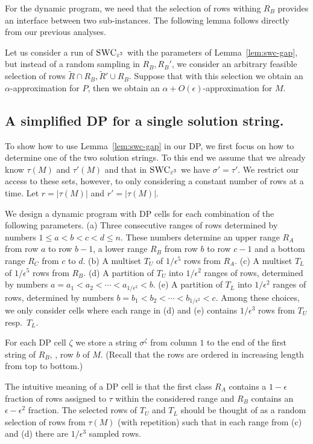     For the dynamic program, we need that the selection of rows withing $R_B$ provides an interface between two sub-instances.
    The following lemma follows directly from our previous analyses.
    \begin{lemma}\label{lem:forgetA}
        Let us consider a run of $\textsc{SWC}_{\varepsilon^3}$ with the parameters of Lemma~\ref{lem:swc-gap}, but instead of a random sampling in $R_B,R_B'$,
        we consider an arbitrary feasible selection of rows $\tilde{R} \cap R_B,\tilde{R}' \cup R_B$.
        Suppose that with this selection we obtain an $\alpha$-approximation for $P$, then we obtain an $\alpha + O(\epsilon)$-approximation for $M$.
    \end{lemma}

\subsection{A simplified DP for a single solution string.}\label{sec:single}
To show how to use Lemma~\ref{lem:swc-gap} in our DP, we first focus on how to determine one of the two solution strings.
To this end we assume that we already know $\tau(M)$ and $\tau'(M)$ and that in $\textsc{SWC}_{\varepsilon^3}$ we have $\sigma' = \tau'$.
We restrict our access to these sets, however, to only considering a constant number of rows at a time.
Let $r = |\tau(M)|$ and $r' = |\tau(M)|$.

We design a dynamic program with DP cells for each combination of the following parameters. 
(a) Three consecutive ranges of rows determined by numbers $1\le a < b < c < d \le n$.
These numbers determine an upper range $R_A$ from row $a$ to row $b-1$, a lower range $R_B$ from row $b$ to row $c-1$ and a bottom range $R_C$ from $c$ to $d$.
(b) A multiset $T_U$ of $1/\epsilon^5$ rows from $R_A$.
(c) A multiset $T_L$ of $1/\epsilon^5$ rows from $R_B$.
(d) A partition of $T_U$ into $1/\epsilon^2$ ranges of rows, determined by numbers $a = a_1 < a_2 < \dotsm < a_{1/\epsilon^2} < b$.
(e) A partition of $T_L$ into $1/\epsilon^2$ ranges of rows, determined by numbers $b = b_1 < b_2 < \dotsm < b_{1/\epsilon^2} < c$.
Among these choices, we only consider cells where each range in (d) and (e) contains $1/\epsilon^3$ rows from $T_U$ resp.\ $T_L$.

For each DP cell $\zeta$ we store a string $\sigma^\zeta$ from column $1$ to the end of the first string of $R_B$, \ie, row $b$ of $M$. 
(Recall that the rows are ordered in increasing length from top to bottom.)

The intuitive meaning of a DP cell is that the first class $R_A$ contains a $1-\epsilon$ fraction of rows assigned to $\tau$ within the considered range and $R_B$ contains an $\epsilon-\epsilon^2$ fraction.
The selected rows of $T_U$ and $T_L$ should be thought of as a random selection of rows from $\tau(M)$ (with repetition) such that in each range from (c) and (d) there are $1/\epsilon^3$ sampled rows.

